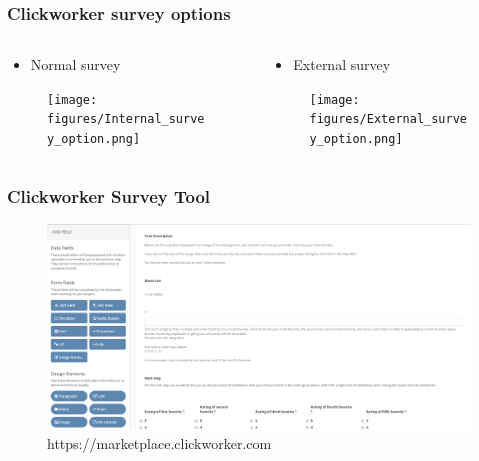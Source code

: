 \begin{frame}
	\frametitle{Clickworker survey options}
	\begin{columns}
		\begin{column}{0.5\textwidth}
			\begin{itemize}
				\item Normal survey
			\end{itemize}
			\begin{figure}
				\centering
				\texttt{[image: figures/Internal\_survey\_option.png]}
			\end{figure}
		\end{column}
		\begin{column}{0.5\textwidth}
			\begin{itemize}
				\item External survey
			\end{itemize}
			\begin{figure}
				\centering
				\texttt{[image: figures/External\_survey\_option.png]}
			\end{figure}
		\end{column}
	\end{columns}
\end{frame}

\begin{frame}
	\frametitle{Clickworker Survey Tool}
	\begin{figure}
		\centering
		\includegraphics[scale=0.275]{figures/InternalSurvey.png}
		\caption{https://marketplace.clickworker.com}
	\end{figure}
\end{frame}

